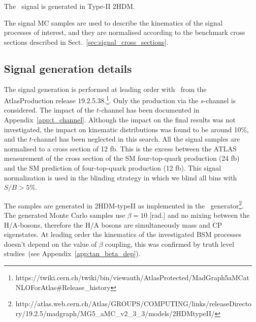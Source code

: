 The \ttH\ signal is generated in Type-II 2HDM.  

The signal MC samples are used to describe the kinematics of the signal processes of interest, and they are 
normalised according to the benchmark cross sections described in Sect.~\ref{sec:signal_cross_sections}.

\subsection{Signal generation details}

The signal generation is performed at leading order with \MadG\ from the AtlasProduction release 19.2.5.38.\footnote{https://twiki.cern.ch/twiki/bin/viewauth/AtlasProtected/MadGraph5aMCatNLOForAtlas\#Release\_history}. Only the production via the $s$-channel is considered. The impact of the $t$-channel has been documented in  Appendix~\ref{app:t_channel}. Although the impact on the final results was not investigated, the impact on kinematic distributions was found to be around 10\%, and the $t$-channel has been neglected in this search. All the signal samples are normalised to a cross section of 12 fb. This is the excess between the ATLAS measurement of the cross section of the SM four-top-quark production (24 fb) \cite{Aad:2020klt} and the SM prediction of four-top-quark production (12 fb). This signal normalization is used in the blinding strategy in which we blind all bins with $S/B>5\%$.

The samples are generated in 2HDM-typeII as implemented in the \MadG\ generator\footnote{http://atlas.web.cern.ch/Atlas/GROUPS/COMPUTING/links/releaseDirectory/19.2.5/madgraph/MG5\_aMC\_v2\_3\_3/models/2HDMtypeII/}.
The generated Monte Carlo samples use $\beta=10$ [rad.] and no mixing between the H/A-bosons, therefore the H/A bosons are simultaneously mass and CP eigenstates.
At leading order the kinematics of the investigated BSM processes doesn't depend on the value of $\beta$ coupling, this was confirmed by truth level 
studies~(see Appendix~\ref{app:tan_beta_dep}).

